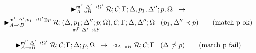 
\begin{multline}
\transx{\matstate{A \lolli B}{\rulestk}{\lstack{C}}{\Gamma}{\Delta, p_1, \Delta''}{p,
   \Omega}{\Delta' \rightarrow \Omega'}}
{\matstate{A \lolli B}{\rulestk}{\lframe{\Delta,
   p_1}{\Delta''}{p}{\Omega}{\Delta'}{\Omega'}, \lstack{C}}{\Gamma}{\Delta,
   \Delta''}{\Omega}{\Delta', p_1 \rightarrow \Omega' \otimes p}} \;\;\; (p_1, \Delta'' \prec p)
   \tag{match p ok}
\end{multline}

\vspace{-5mm}

\begin{align}
\trans{\matstate{A \lolli B}{\rulestk}{\lstack{C}}{\Gamma}{\Delta}{p,
   \Omega}{\Delta' \rightarrow \Omega'}}
{\contstate{A \lolli B}{\rulestk}{\lstack{C}}{\Gamma}} \;\;\; (\Delta \npreceq
      p) \tag{match p fail}
\end{align}
